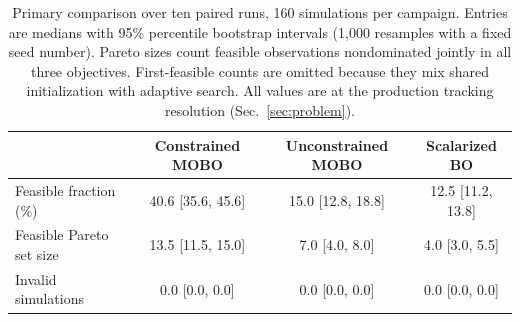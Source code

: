 \begin{table}[htbp]
\centering
\caption{Primary comparison over ten paired runs, 160 simulations per campaign.
Entries are medians with 95\% percentile bootstrap intervals (1,000 resamples with a fixed seed number).
Pareto sizes count feasible observations nondominated jointly in all three objectives.
First-feasible counts are omitted because they mix shared initialization with adaptive search. All values are at the production tracking resolution (Sec.~\ref{sec:problem}).}
\label{tab:primary}
\small
\begin{tabular}{lccc}
\toprule
 & Constrained MOBO & Unconstrained MOBO & Scalarized BO \\
\midrule
Feasible fraction (\%) & 40.6 [35.6, 45.6] & 15.0 [12.8, 18.8] & 12.5 [11.2, 13.8] \\
Feasible Pareto set size & 13.5 [11.5, 15.0] & 7.0 [4.0, 8.0] & 4.0 [3.0, 5.5] \\
Invalid simulations & 0.0 [0.0, 0.0] & 0.0 [0.0, 0.0] & 0.0 [0.0, 0.0] \\
\bottomrule
\end{tabular}
\end{table}
